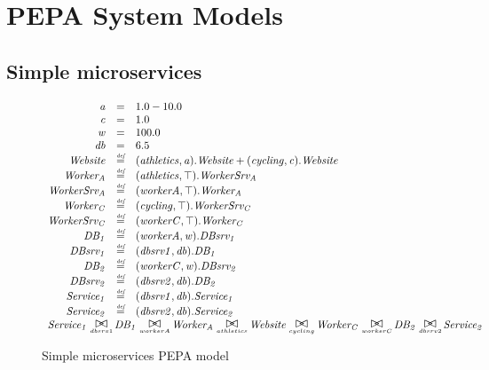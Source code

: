 %
%

\section{PEPA System Models}

%
%
\subsection{Simple microservices}

\begin{figure}
	\caption{Simple microservices PEPA model}
	\label{figure:simplemicro}
	\centering
	\begin{displaymath}
		\begin{array}{rcl}
			\mathit{a} & = & 1.0 - 10.0\\
			\mathit{c} & = & 1.0\\
			\mathit{w} & = & 100.0\\
			\mathit{db} & = & 6.5\\
			[0.0ex]		\mathit{Website} & \rmdef & (\mathit{athletics},\mathit{a}).\mathit{Website}+(\mathit{cycling},\mathit{c}).\mathit{Website}\\
			\mathit{Worker_A} & \rmdef & (\mathit{athletics},\top).\mathit{WorkerSrv_A}\\
			\mathit{WorkerSrv_A} & \rmdef & (\mathit{workerA},\top).\mathit{Worker_A}\\
			\mathit{Worker_C} & \rmdef & (\mathit{cycling},\top).\mathit{WorkerSrv_C}\\
			\mathit{WorkerSrv_C} & \rmdef & (\mathit{workerC},\top).\mathit{Worker_C}\\
			\mathit{DB_1} & \rmdef & (\mathit{workerA},\mathit{w}).\mathit{DBsrv_1}\\
			\mathit{DBsrv_1} & \rmdef & (\mathit{dbsrv1},\mathit{db}).\mathit{DB_1}\\
			\mathit{DB_2} & \rmdef & (\mathit{workerC},\mathit{w}).\mathit{DBsrv_2}\\
			\mathit{DBsrv_2} & \rmdef & (\mathit{dbsrv2},\mathit{db}).\mathit{DB_2}\\
			\mathit{Service_1} & \rmdef & (\mathit{dbsrv1},\mathit{db}).\mathit{Service_1}\\
			\mathit{Service_2} & \rmdef & (\mathit{dbsrv2},\mathit{db}).\mathit{Service_2}\\
			[0.0ex]		\multicolumn{3}{l}{\mathit{Service_1}\sync{dbsrv1}\mathit{DB_1}\sync{workerA}\mathit{Worker_A}\sync{athletics}\mathit{Website}\sync{cycling}\mathit{Worker_C}\sync{workerC}\mathit{DB_2}\sync{dbsrv2}\mathit{Service_2}}\\
			[0.0ex]	\end{array}
	\end{displaymath}
\end{figure}

